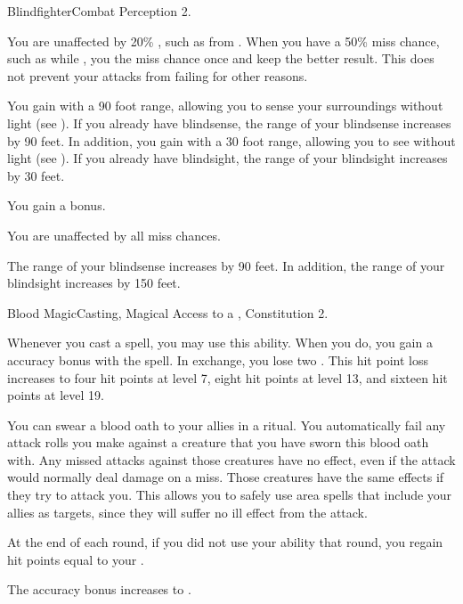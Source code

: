   \begin{feat}{Blindfighter}{Combat}
    \featpre Perception 2.

     You are unaffected by 20\% , such as from .
    When you have a 50\% miss chance, such as while \blinded, you  the miss chance once and keep the better result.
    This does not prevent your attacks from failing for other reasons.

     You gain  with a 90 foot range, allowing you to sense your surroundings without light (see ).
    If you already have blindsense, the range of your blindsense increases by 90 feet.
    In addition, you gain  with a 30 foot range, allowing you to see without light (see ).
    If you already have blindsight, the range of your blindsight increases by 30 feet.

     You gain a   bonus.

     You are unaffected by all miss chances.

     The range of your blindsense increases by 90 feet.
    In addition, the range of your blindsight increases by 150 feet.
  \end{feat}

  \begin{magicalfeat}{Blood Magic}{Casting, Magical}
    \featpre Access to a , Constitution 2.

     Whenever you cast a spell, you may use this ability.
    When you do, you gain a  accuracy bonus with the spell.
    In exchange, you lose two .
    This hit point loss increases to four hit points at level 7, eight hit points at level 13, and sixteen hit points at level 19.

     You can swear a blood oath to your allies in a ritual.
    You automatically fail any attack rolls you make against a creature that you have sworn this blood oath with.
    Any missed attacks against those creatures have no effect, even if the attack would normally deal damage on a miss.
    Those creatures have the same effects if they try to attack you.
    This allows you to safely use area spells that include your allies as targets, since they will suffer no ill effect from the attack.

     At the end of each round, if you did not use your  ability that round, you regain hit points equal to your .

     The accuracy bonus increases to .
  \end{magicalfeat}

